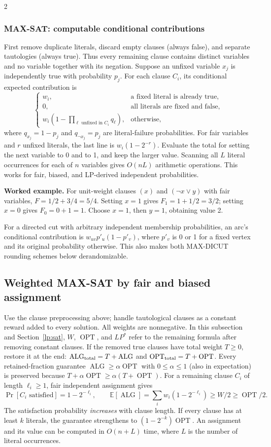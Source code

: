 \documentclass[10pt]{article}
\theoremstyle{definition}
\newcommand{\OPT}{\operatorname{OPT}}
\newcommand{\ALG}{\operatorname{ALG}}
\begin{document}
\begin{multicols*}{2}
\subsubsection*{MAX-SAT: computable conditional contributions}
First remove duplicate literals, discard empty clauses (always false), and
separate tautologies (always true). Thus every remaining clause contains
distinct variables and no variable together with its negation. Suppose an
unfixed variable $x_j$ is independently true with probability $p_j$.
For each clause $C_i$, its conditional expected contribution is
\[
  \begin{cases}
    w_i, &\text{a fixed literal is already true},\\
    0, &\text{all literals are fixed and false},\\
    w_i\left(1-\displaystyle\prod_{\ell\text{ unfixed in }C_i}
       q_\ell\right), &\text{otherwise},
  \end{cases}
\]
where $q_{x_j}=1-p_j$ and $q_{\neg x_j}=p_j$ are literal-failure
probabilities. For fair variables and $r$ unfixed literals, the last line is
$w_i(1-2^{-r})$. Evaluate the total for setting the next variable to 0 and
to 1, and keep the larger value. Scanning all $L$ literal occurrences for
each of $n$ variables gives $O(nL)$ arithmetic operations. This works for
fair, biased, and LP-derived independent probabilities.

\textbf{Worked example.}
For unit-weight clauses $(x)$ and $(\neg x\lor y)$ with fair variables,
$F=1/2+3/4=5/4$. Setting $x=1$ gives $F_1=1+1/2=3/2$; setting $x=0$
gives $F_0=0+1=1$. Choose $x=1$, then $y=1$, obtaining value 2.

For a directed cut with arbitrary independent membership probabilities,
an arc's conditional contribution is $w_{uv}p'_u(1-p'_v)$, where $p'_v$ is
0 or 1 for a fixed vertex and its original probability otherwise.
This also makes both MAX-DICUT rounding schemes below derandomizable.

\subsection{Weighted MAX-SAT by fair and biased assignment}\label{ra:sat}
Use the clause preprocessing above; handle tautological clauses as a constant
reward added to every solution. All weights are nonnegative. In this
subsection and Section~\ref{lp:sat}, $W$, $\OPT$, and $LP^*$ refer to the
remaining formula after removing constant clauses. If the removed true
clauses have total weight $T\ge0$, restore it at the end:
$\ALG_{\rm total}=T+\ALG$ and $\OPT_{\rm total}=T+\OPT$.
Every retained-fraction guarantee $\ALG\ge\alpha\OPT$ with $0\le\alpha\le1$
(also in expectation) is preserved because
$T+\alpha\OPT\ge\alpha(T+\OPT)$.
For a remaining
clause $C_i$ of length $\ell_i\ge1$, fair independent assignment gives
\[
  \Pr[C_i\text{ satisfied}]=1-2^{-\ell_i},\qquad
  \mathbb E[\ALG]=\sum_iw_i(1-2^{-\ell_i})\ge W/2\ge\OPT/2.
\]
The satisfaction probability \emph{increases} with clause length. If every
clause has at least $k$ literals, the guarantee strengthens to
$(1-2^{-k})\OPT$. An assignment and its value can be computed in $O(n+L)$
time, where $L$ is the number of literal occurrences.


\end{multicols*}
\end{document}
